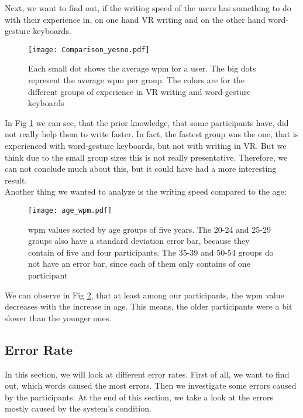 Next, we want to find out, if the writing speed of the users has something to do with their experience in, on one hand VR writing and on the other hand word-gesture keyboards.\\

\begin{figure}[H]
    \centering
    \texttt{[image: Comparison\_yesno.pdf]}
    \caption{Each small dot shows the average wpm for a user. The big dots represent the average wpm per group. The colors are for the different groups of experience in VR writing and word-gesture keyboards}
    \label{fig:WPM_yesno}
\end{figure}

In Fig \ref{fig:WPM_yesno} we can see, that the prior knowledge, that some participants have, did not really help them to write faster. In fact, the fastest group was the one, that is experienced with word-gesture keyboards, but not with writing in VR. But we think due to the small group sizes this is not really presentative. Therefore, we can not conclude much about this, but it could have had a more interesting result.\\

Another thing we wanted to analyze is the writing speed compared to the age:
\begin{figure}[H]
    \centering
    \texttt{[image: age\_wpm.pdf]}
    \caption{wpm values sorted by age groups of five years. The 20-24 and 25-29 groups also have a standard deviation error bar, because they contain of five and four participants. The 35-39 and 50-54 groups do not have an error bar, since each of them only contains of one participant}
    \label{fig:WPM_age}
\end{figure}

We can observe in Fig \ref{fig:WPM_age}, that at least among our participants, the wpm value decreases with the increase in age. This means, the older participants were a bit slower than the younger ones. 

\subsection{Error Rate}
In this section, we will look at different error rates. First of all, we want to find out, which words caused the most errors. Then we investigate some errors caused by the participants. At the end of this section, we take a look at the errors mostly caused by the system's condition.\\


